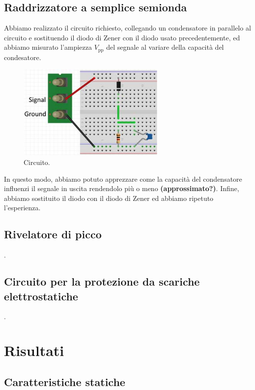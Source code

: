 \documentclass[a4paper]{article}
\begin{document}
{{		\subsection{Raddrizzatore a semplice semionda}
			Abbiamo realizzato il circuito richiesto, collegando un condensatore in parallelo al circuito e sostituendo il diodo di Zener con il diodo usato precedentemente, ed abbiamo misurato l'ampiezza $ V_{\mathrm{pp}} $ del segnale al variare della capacità del condesatore.
			\begin{figure}[h!]
				\centering
				\includegraphics[scale=0.7]{circuitoRaddrizzatoreASempliceSemionda}
				\caption{Circuito.}
				\label{fig:circuitoRaddrizzatoreASempliceSemionda}
			\end{figure}
			\newline
			In questo modo, abbiamo potuto apprezzare come la capacità del condensatore influenzi il segnale in uscita rendendolo più o meno \textbf{(approssimato?)}.
			Infine, abbiamo sostituito il diodo con il diodo di Zener ed abbiamo ripetuto l'esperienza.
		\subsection{Rivelatore di picco}
			.
		\subsection{Circuito per la protezione da scariche elettrostatiche}
			.
	\section{Risultati}
		\subsection{Caratteristiche statiche}
}}
\end{document}
